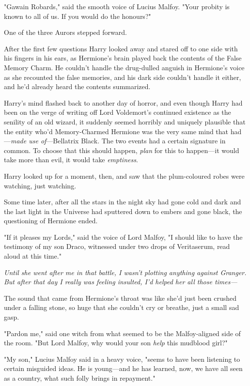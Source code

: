 "Gawain Robards," said the smooth voice of Lucius Malfoy. "Your probity is
known to all of us. If you would do the honours?"

One of the three Aurors stepped forward.

After the first few questions Harry looked away and stared off to one side with
his fingers in his ears, as Hermione's brain played back the contents of the
False Memory Charm. He couldn't handle the drug-dulled anguish in Hermione's
voice as she recounted the false memories, and his dark side couldn't handle it
either, and he'd already heard the contents summarized.

Harry's mind flashed back to another day of horror, and even though Harry had
been on the verge of writing off Lord Voldemort's continued existence as the
senility of an old wizard, it suddenly seemed horribly and uniquely plausible
that the entity who'd Memory-Charmed Hermione was the very same mind that
had---\emph{made use of}---Bellatrix Black. The two events had a certain
signature in common. To choose that this should happen, \emph{plan} for this to
happen---it would take more than evil, it would take \emph{emptiness}.

Harry looked up for a moment, then, and saw that the plum-coloured robes were
watching, just watching.

Some time later, after all the stars in the night sky had gone cold and dark
and the last light in the Universe had sputtered down to embers and gone black,
the questioning of Hermione ended.

"If it pleases my Lords," said the voice of Lord Malfoy, "I should like to have
the testimony of my son Draco, witnessed under two drops of Veritaserum, read
aloud at this time."

\emph{Until she went after me in that battle, I wasn't plotting anything
against Granger. But after that day I really was feeling insulted, I'd helped
her all those times---}

The sound that came from Hermione's throat was like she'd just been crushed
under a falling stone, so huge that she couldn't cry or breathe, just a small
sad gasp.

"Pardon me," said one witch from what seemed to be the Malfoy-aligned side of
the room. "But Lord Malfoy, why would your son \emph{help} this mudblood girl?"

"My son," Lucius Malfoy said in a heavy voice, "seems to have been listening to
certain misguided ideas. He is young---and he has learned, now, we have all
seen as a country, what such folly brings in repayment."

